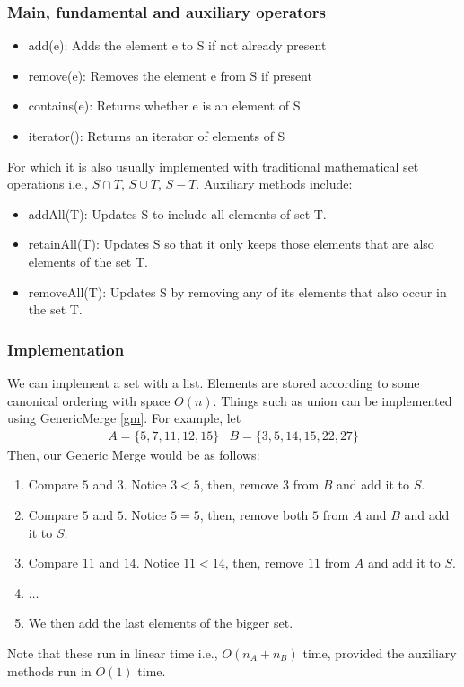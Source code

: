 \documentclass[a4paper]{article}
\theoremstyle{plain}
\theoremstyle{definition}
\theoremstyle{remark}
\begin{document}
\subsubsection{Main, fundamental and auxiliary operators}
\begin{itemize}
	\item add(e): Adds the element e to S if not already present
	\item remove(e): Removes the element e from S if present
	\item contains(e): Returns whether e is an element of S
	\item iterator(): Returns an iterator of elements of S
\end{itemize}
For which it is also usually implemented with traditional mathematical set operations i.e., $S \cap T$, $S \cup T$, $ S - T$.
Auxiliary methods include:
\begin{itemize}
	\item addAll(T): Updates S to include all elements of set T.
	\item retainAll(T): Updates S so that it only keeps those elements that are also elements of the set T.
	\item removeAll(T): Updates S by removing any of its elements that also occur in the set T.
\end{itemize}
\subsubsection{Implementation}
We can implement a set with a list. Elements are stored according to some canonical ordering with space $O(n)$. Things such as union can be implemented using GenericMerge \ref{gm}. For example, let
\begin{align*}
	A = \{ 5,7,11,12,15\} & B = \{ 3,5,14,15,22,27\}
\end{align*}
Then, our Generic Merge would be as follows:
\begin{enumerate}
	\item Compare $5$ and $3$.  Notice $3<5$, then, remove $3$ from $B$ and add it to $S$.
	\item Compare $5$ and $5$. Notice $5=5$, then, remove both $5$ from $A$ and $B$ and add it to $S$.
	\item Compare $11$ and $14$. Notice $11<14$, then, remove $11$ from $A$ and add it to $S$.
	\item $\ldots$ 
	\item We then add the last elements of the bigger set.
\end{enumerate}
Note that these run in linear time i.e., $O(n_A + n_B)$ time, provided the auxiliary methods run in $O(1)$ time.
\end{document}
